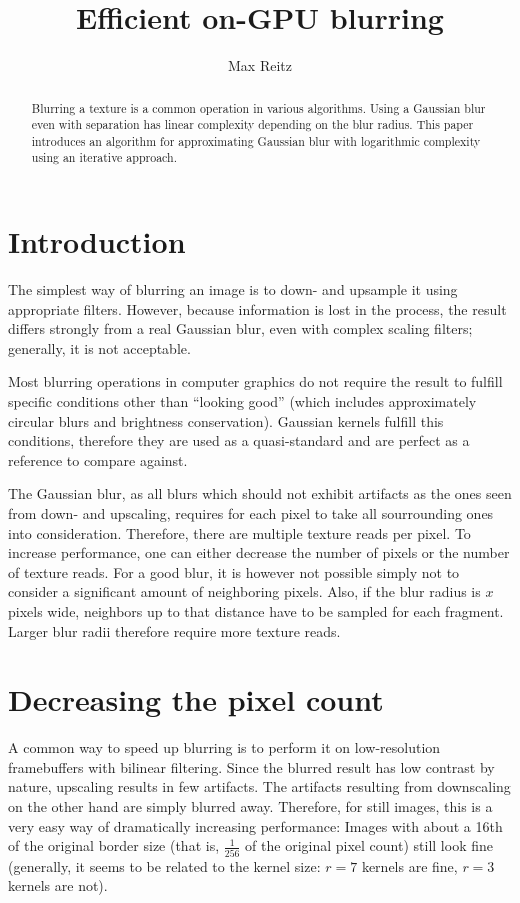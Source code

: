 \documentclass[english,fleqn,10pt,twocolumn]{article}
\date{}
\title{Efficient on-GPU blurring}
\author{Max Reitz}
\begin{document}
\maketitle

\begin{abstract}
    Blurring a texture is a common operation in various algorithms. Using a Gaussian blur even with separation has linear complexity depending on the blur radius. This paper introduces an algorithm
    for approximating Gaussian blur with logarithmic complexity using an iterative approach.
\end{abstract}


\section{Introduction}

The simplest way of blurring an image is to down- and upsample it using appropriate filters. However, because information is lost in the process, the result differs strongly from a real Gaussian blur,
even with complex scaling filters; generally, it is not acceptable.

Most blurring operations in computer graphics do not require the result to fulfill specific conditions other than “looking good” (which includes approximately circular blurs and brightness
conservation). Gaussian kernels fulfill this conditions, therefore they are used as a quasi-standard and are perfect as a reference to compare against.

The Gaussian blur, as all blurs which should not exhibit artifacts as the ones seen from down- and upscaling, requires for each pixel to take all sourrounding ones into consideration. Therefore, there
are multiple texture reads per pixel. To increase performance, one can either decrease the number of pixels or the number of texture reads. For a good blur, it is however not possible simply not to
consider a significant amount of neighboring pixels. Also, if the blur radius is $x$ pixels wide, neighbors up to that distance have to be sampled for each fragment. Larger blur radii therefore
require more texture reads.


\section{Decreasing the pixel count}

A common way to speed up blurring is to perform it on low-resolution framebuffers with bilinear filtering. Since the blurred result has low contrast by nature, upscaling results in few artifacts. The
artifacts resulting from downscaling on the other hand are simply blurred away. Therefore, for still images, this is a very easy way of dramatically increasing performance: Images with about a 16th of
the original border size (that is, $\frac 1{256}$ of the original pixel count) still look fine (generally, it seems to be related to the kernel size: $r = 7$ kernels are fine, $r = 3$ kernels are
not).
\end{document}
